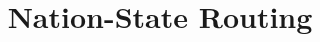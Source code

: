 \documentclass{sig-alternate-05-2015}
\begin{document}






%

\title{Nation-State Routing}
%
%
%
%
%
\end{document}
